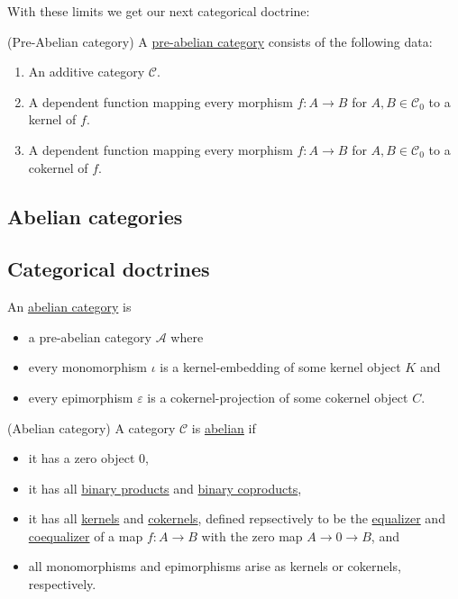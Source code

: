 With these limits we get our next categorical doctrine:

\begin{definition}{(Pre-Abelian category)}
A \ul{pre-abelian category} consists of the following data:
\begin{enumerate}
\item An additive category $\mathcal{C}$.
\item A dependent function mapping every morphism $f : A \rightarrow B$ for $A, B \in \mathcal{C}_{0}$ to a
kernel of $f$.
\item A dependent function mapping every morphism $f : A \rightarrow B$ for $A, B \in \mathcal{C}_{0}$ to a
cokernel of $f$.
\end{enumerate}
\end{definition}

\subsection{Abelian categories}



\subsection{Categorical doctrines}





\begin{definition}\label{def:abelian_category}
An \ul{abelian category} is
\begin{itemize}
\item a pre-abelian category $\mathcal{A}$ where
\item every monomorphism $\iota$ is a kernel-embedding of some kernel object $K$ and
\item every epimorphism $\varepsilon$ is a cokernel-projection of some cokernel object $C$.
\end{itemize}
\end{definition}

\begin{definition}{(Abelian category)}
A category $\mathcal{C}$ is \ul{abelian} if
\begin{itemize}
\item it has a zero object $0$,
\item it has all \ul{binary products} and \ul{binary coproducts},
\item it has all \ul{kernels} and \ul{cokernels}, defined repsectively to be the \ul{equalizer} and
\ul{coequalizer} of a map $f : A \rightarrow B$ with the zero map $A \rightarrow 0 \rightarrow B$, and
\item all monomorphisms and epimorphisms arise as kernels or cokernels, respectively.
\end{itemize}
\end{definition}







